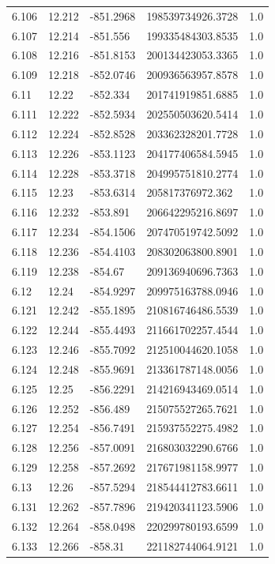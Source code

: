 \begin{tabular}{lllll}
6.106 & 12.212 & -851.2968 & 198539734926.3728 & 1.0 \\
6.107 & 12.214 & -851.556 & 199335484303.8535 & 1.0 \\
6.108 & 12.216 & -851.8153 & 200134423053.3365 & 1.0 \\
6.109 & 12.218 & -852.0746 & 200936563957.8578 & 1.0 \\
6.11 & 12.22 & -852.334 & 201741919851.6885 & 1.0 \\
6.111 & 12.222 & -852.5934 & 202550503620.5414 & 1.0 \\
6.112 & 12.224 & -852.8528 & 203362328201.7728 & 1.0 \\
6.113 & 12.226 & -853.1123 & 204177406584.5945 & 1.0 \\
6.114 & 12.228 & -853.3718 & 204995751810.2774 & 1.0 \\
6.115 & 12.23 & -853.6314 & 205817376972.362 & 1.0 \\
6.116 & 12.232 & -853.891 & 206642295216.8697 & 1.0 \\
6.117 & 12.234 & -854.1506 & 207470519742.5092 & 1.0 \\
6.118 & 12.236 & -854.4103 & 208302063800.8901 & 1.0 \\
6.119 & 12.238 & -854.67 & 209136940696.7363 & 1.0 \\
6.12 & 12.24 & -854.9297 & 209975163788.0946 & 1.0 \\
6.121 & 12.242 & -855.1895 & 210816746486.5539 & 1.0 \\
6.122 & 12.244 & -855.4493 & 211661702257.4544 & 1.0 \\
6.123 & 12.246 & -855.7092 & 212510044620.1058 & 1.0 \\
6.124 & 12.248 & -855.9691 & 213361787148.0056 & 1.0 \\
6.125 & 12.25 & -856.2291 & 214216943469.0514 & 1.0 \\
6.126 & 12.252 & -856.489 & 215075527265.7621 & 1.0 \\
6.127 & 12.254 & -856.7491 & 215937552275.4982 & 1.0 \\
6.128 & 12.256 & -857.0091 & 216803032290.6766 & 1.0 \\
6.129 & 12.258 & -857.2692 & 217671981158.9977 & 1.0 \\
6.13 & 12.26 & -857.5294 & 218544412783.6611 & 1.0 \\
6.131 & 12.262 & -857.7896 & 219420341123.5906 & 1.0 \\
6.132 & 12.264 & -858.0498 & 220299780193.6599 & 1.0 \\
6.133 & 12.266 & -858.31 & 221182744064.9121 & 1.0 \\

\end{tabular}
